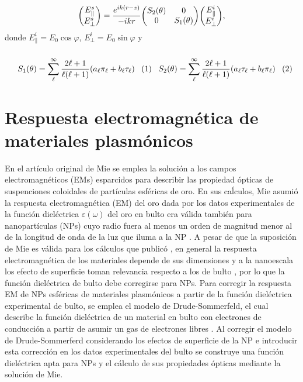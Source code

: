 	\begin{tcolorbox}[title = Matriz de esparcimiento de Mie,  breakable ]
	\begin{align}
	\mqty(E_{\parallel}^s\\E_{\perp}^s)  =  
		\frac{e^{ik(r-z)}}{-ikr} \mqty(S_2 (\theta) & 0\\ 0 & S_1 (\theta))
	\mqty(E_{\parallel}^i\\E_{\perp}^i),	
	\label{eq:MieMatrix}
	\end{align}
	donde $E^i_\parallel=E_0\cos\varphi$, $E^i_\perp = E_0\sin\varphi$ y \begin{subequations}\\
	\eqhalf{	S_1 (\theta) = \sum_\ell^\infty\frac{2\ell+1}{\ell(\ell+1)}(a_\ell\pi_\ell+b_\ell\tau_\ell)
				\label{eqs:S_1}}
	\eqhalf{	S_2 (\theta) = \sum_\ell^\infty\frac{2\ell+1}{\ell(\ell+1)}( a_\ell \tau_\ell + b_\ell\pi_\ell )
			 \label{eqs:S_2}	}
	\label{eq:MatrixElements}	\end{subequations}
	\end{tcolorbox}\vspace*{-.5em}\noindent

\section{Respuesta electromagnética de materiales plasmónicos}

En el artículo original de Mie \cite{mie1908metallosung} se emplea la solución a los campos electromagnéticos (EMs) esparcidos para describir las propiedad ópticas de suspenciones coloidales de partículas esféricas de oro. En sus caĺculos, Mie asumió la  respuesta electromagnética (EM) del oro dada por los datos experimentales de la función dieléctrica $\varepsilon(\omega)$ del oro en bulto era válida también para nanopartículas (NPs) cuyo radio fuera al menos un orden de magnitud menor al de la longitud de onda de la luz que iluma a la NP \cite{horvath2009historic}. A pesar de que la suposición de Mie es válida para los cálculos que publicó \cite{horvath2009historic}, en general la respuesta electromagnética de los materiales depende de sus dimensiones y a la nanoescala los efecto de superficie toman relevancia respecto a los de bulto \cite{boverhof2015comparative}, por lo que la función dieléctrica de bulto debe corregirse para NPs. Para corregir la respuesta EM de NPs esféricas de materiales plasmónicos a partir de la función dieléctrica experimental de bulto, se emplea el modelo de Drude-Sommerfeld, el cual describe la función dieléctrica de un material en bulto con electrones de conducción a partir de asumir un gas de electrones libres \cite{gross2014festkorperphysik}. Al corregir el modelo de Drude-Sommerferd considerando los efectos de superficie de la NP e introducir esta corrección en los datos experimentales del bulto se construye una función dieléctrica apta para NPs y el cálculo de sus propiedades ópticas mediante la solución de Mie.

